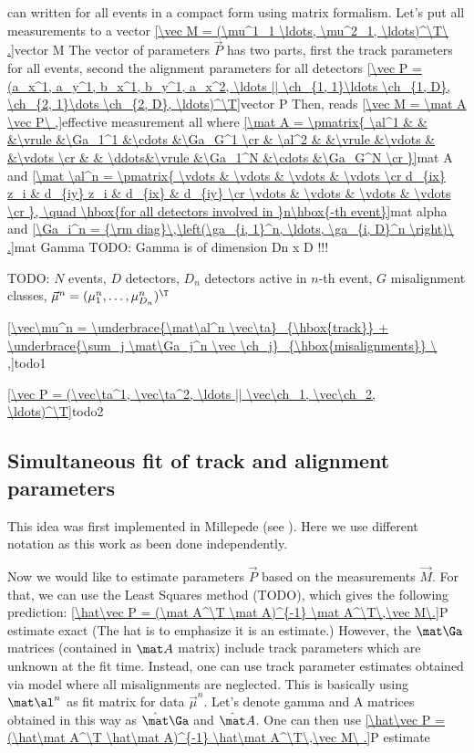  can written for all events in a compact form using matrix formalism. Let's put all measurements to a vector
\eqref{\vec M = (\mu^1_1 \ldots, \mu^2_1, \ldots)^\T\ .}{vector M}
The vector of parameters $\vec P$ has two parts, first the track parameters for all events, second the alignment parameters for all detectors
\eqref{\vec P = (a_x^1, a_y^1, b_x^1, b_y^1, a_x^2, \ldots || \ch_{1, 1}\ldots \ch_{1, D}, \ch_{2, 1}\dots \ch_{2, D}, \ldots)^\T}{vector P}
Then,  reads
\eqref{\vec M = \mat A \vec P\ ,}{effective measurement all}
where
\eqref{\mat A = \pmatrix{
\al^1 & 		&		&\vrule	&\Ga_1^1	&\cdots	&\Ga_G^1	\cr
	& \al^2	&		&\vrule	&\vdots		&		&\vdots		\cr
	&		& \ddots&\vrule	&\Ga_1^N	&\cdots	&\Ga_G^N	\cr
}}{mat A}
and
\eqref{\mat \al^n = \pmatrix{
\vdots & \vdots & \vdots & \vdots \cr
d_{ix} z_i & d_{iy} z_i & d_{ix} & d_{iy} \cr
\vdots & \vdots & \vdots & \vdots \cr
}, \quad \hbox{for all detectors involved in }n\hbox{-th event}}{mat alpha}
and
\eqref{\Ga_i^n = {\rm diag}\,\left(\ga_{i, 1}^n, \ldots, \ga_{i, D}^n \right)\ .}{mat Gamma}
TODO: Gamma is of dimension Dn x D !!!

TODO: $N$ events, $D$ detectors, $D_n$ detectors active in $n$-th event, $G$ misalignment classes, $\vec\mu^n = (\mu^n_1, \ldots, \mu_{D_n}^n)^\T$

\eqref{\vec\mu^n =
\underbrace{\mat\al^n \vec\ta}_{\hbox{track}}
+
\underbrace{\sum_j \mat\Ga_j^n \vec \ch_j}_{\hbox{misalignments}}
\ ,}{todo1}

\eqref{\vec P = (\vec\ta^1, \vec\ta^2, \ldots || \vec\ch_1, \vec\ch_2, \ldots)^\T}{todo2}



\subsection{Simultaneous fit of track and alignment parameters}

This idea was first implemented in Millepede (see ). Here we use different notation as this work as been done independently.

Now we would like to estimate parameters $\vec P$ based on the measurements $\vec M$. For that, we can use the Least Squares method (TODO), which gives the following prediction:
\eqref{\hat\vec P = (\mat A^\T \mat A)^{-1} \mat A^\T\,\vec M\.}{P estimate exact}
(The hat is to emphasize it is an estimate.) However, the $\mat\Ga$ matrices (contained in $\mat A$ matrix) include track parameters which are unknown at the fit time. Instead, one can use track parameter estimates obtained via model where all misalignments are neglected. This is basically using $\mat \al^n$ as fit matrix for data $\vec \mu^n$. Let's denote gamma and A matrices obtained in this way as $\hat\mat\Ga$ and $\hat\mat A$. One can then use
\eqref{\hat\vec P = (\hat\mat A^\T \hat\mat A)^{-1} \hat\mat A^\T\,\vec M\ .}{P estimate}

